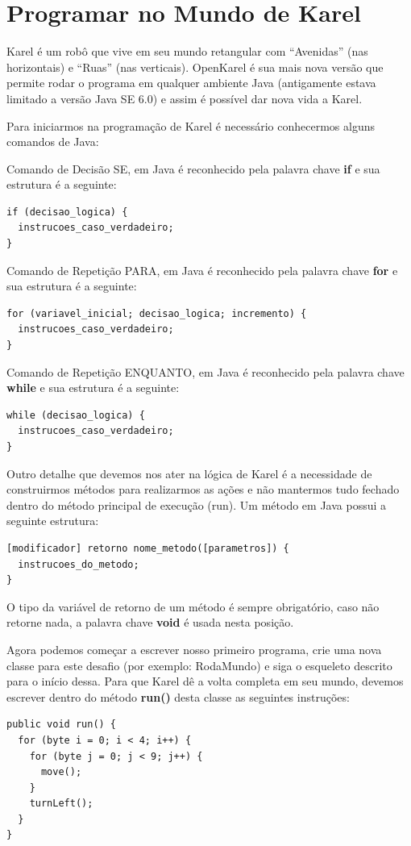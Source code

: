 \documentclass[a4paper,11pt]{article}
\begin{document}
\section{Programar no Mundo de Karel}
Karel é um robô que vive em seu mundo retangular com ``Avenidas'' (nas horizontais) e ``Ruas'' (nas verticais). OpenKarel é sua mais nova versão que permite rodar o programa em qualquer ambiente Java (antigamente estava limitado a versão Java SE 6.0) e assim é possível dar nova vida a Karel.

Para iniciarmos na programação de Karel é necessário conhecermos alguns comandos de Java:

Comando de Decisão SE, em Java é reconhecido pela palavra chave \textbf{if} e sua estrutura é a seguinte:
\begin{lstlisting}
if (decisao_logica) {
  instrucoes_caso_verdadeiro;
}
\end{lstlisting}

Comando de Repetição PARA, em Java é reconhecido pela palavra chave \textbf{for} e sua estrutura é a seguinte:
\begin{lstlisting}
for (variavel_inicial; decisao_logica; incremento) {
  instrucoes_caso_verdadeiro;
}
\end{lstlisting}

Comando de Repetição ENQUANTO, em Java é reconhecido pela palavra chave \textbf{while} e sua estrutura é a seguinte:
\begin{lstlisting}
while (decisao_logica) {
  instrucoes_caso_verdadeiro;
}
\end{lstlisting}

Outro detalhe que devemos nos ater na lógica de Karel é a necessidade de construirmos métodos para realizarmos as ações e não mantermos tudo fechado dentro do método principal de execução (run). Um método em Java possui a seguinte estrutura:
\begin{lstlisting}
[modificador] retorno nome_metodo([parametros]) {
  instrucoes_do_metodo;
}
\end{lstlisting}

O tipo da variável de retorno de um método é sempre obrigatório, caso não retorne nada, a palavra chave \textbf{void} é usada nesta posição.

Agora podemos começar a escrever nosso primeiro programa, crie uma nova classe para este desafio (por exemplo: RodaMundo) e siga o esqueleto descrito para o início dessa. Para que Karel dê a volta completa em seu mundo, devemos escrever dentro do método \textbf{run()} desta classe as seguintes instruções:
\begin{lstlisting}
public void run() {
  for (byte i = 0; i < 4; i++) {
    for (byte j = 0; j < 9; j++) {
      move();
    }
    turnLeft();
  }
}
\end{lstlisting}
\end{document}
